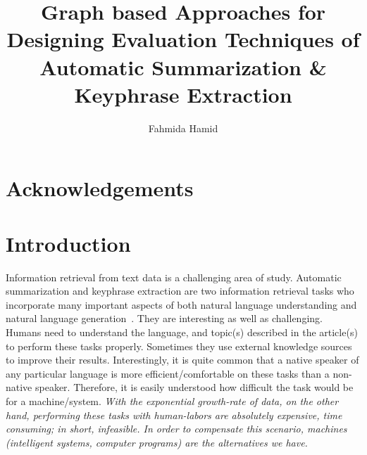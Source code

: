 \documentclass[a4paper]{report}
\begin{document}
\title{Graph based Approaches for Designing Evaluation Techniques of Automatic Summarization \& Keyphrase Extraction}
\author{Fahmida Hamid}
\date{}

\maketitle
{}
\tableofcontents
\listoffigures
\listoftables

\chapter*{Acknowledgements}
\begin{abstract}
\end{abstract}

\chapter{Introduction}
\label{intro}
Information retrieval from text data is a challenging area of study. Automatic summarization and keyphrase extraction are two information retrieval tasks who incorporate many important aspects of both natural language understanding and natural language generation~\cite{Radev:2003:ECL:1075096.1075144}. They are interesting as well as challenging. Humans need to understand the language, and topic(s) described in the article(s) to perform these tasks properly. Sometimes they use external knowledge sources to improve their results. Interestingly, it is quite common that a native speaker of any particular language is more efficient/comfortable on these tasks than a non-native speaker. Therefore, it is easily understood how difficult the task would be for a machine/system. \emph{With the exponential growth-rate of data, on the other hand, performing these tasks with human-labors are absolutely expensive, time consuming; in short, infeasible. In order to compensate this scenario, machines (intelligent systems, computer programs) are the alternatives we have.}\\   
\end{document}
